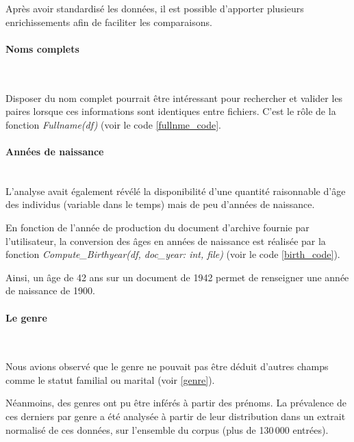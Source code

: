 \documentclass[a4paper,12pt,twoside]{book}
\begin{document}
	               Après avoir standardisé les données, il est possible d'apporter plusieurs enrichissements afin de faciliter les comparaisons.
	               
	               \paragraph{Noms complets}\mbox{}\\
	               \label{fullnme}
	               
	               Disposer du nom complet pourrait être intéressant pour rechercher et valider les paires lorsque ces informations sont identiques entre fichiers. C'est le rôle de la fonction \textit{Fullname(df)} (voir le code \ref{fullnme_code}.

	               \paragraph{Années de naissance}\mbox{}\\
	               
	               \label{birth}L'analyse avait également révélé la disponibilité d'une quantité raisonnable d'âge des individus (variable dans le temps) mais de peu d'années de naissance.
	               
	               En fonction de l'année de production du document d'archive fournie par l'utilisateur, la conversion des âges en années de naissance est réalisée par la fonction \textit{Compute\_Birthyear(df, doc\_year: int, file)} (voir le code \ref{birth_code}).
	               
	               Ainsi, un âge de 42 ans sur un document de 1942 permet de renseigner une année de naissance de 1900.

	               \paragraph{Le genre}\mbox{}\\
	               \label{gender}
	               
	               Nous avions observé que le genre ne pouvait pas être déduit d'autres champs comme le statut familial ou marital (voir \ref{genre}).
	               
	               Néanmoins, des genres ont pu être inférés à partir des prénoms. La prévalence de ces derniers par genre a été analysée à partir de leur distribution dans un extrait normalisé de ces données, sur l'ensemble du corpus (plus de 130\,000 entrées).
	               
\end{document}
